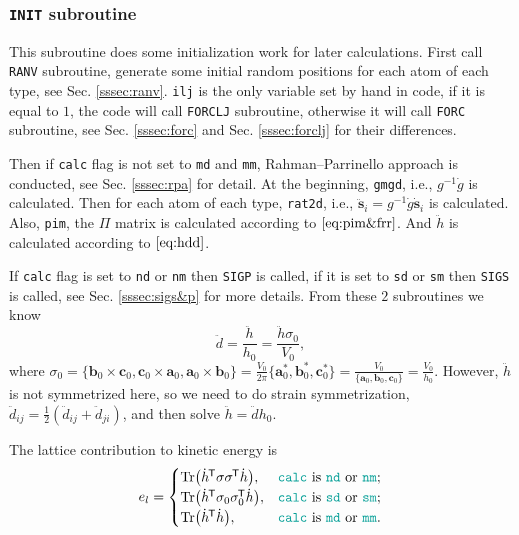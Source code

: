 
\subsubsection{\texttt{INIT} subroutine}
\label{sssec:init}

This subroutine does some initialization work for later calculations.
First call \texttt{RANV} subroutine,
generate some initial random positions for each atom of each type,
see Sec. \ref{sssec:ranv}.
\texttt{ilj} is the only variable set by hand in code, if it is equal to $1$,
the code will call \texttt{FORCLJ} subroutine, otherwise it will call \texttt{FORC}
subroutine, see Sec. \ref{sssec:forc} and Sec. \ref{sssec:forclj} for their differences.

Then if \texttt{calc} flag is not set to \texttt{md} and \texttt{mm},
Rahman--Parrinello approach is conducted, see Sec. \ref{sssec:rpa} for detail.
At the beginning, \texttt{gmgd}, i.e., $g^{-1} \dot{g}$ is calculated.
Then for each atom of each type,
\texttt{rat2d}, i.e., $\ddot{\bm{s}}_i = g^{-1} \dot{g} \dot{ \bm{s} }_i$ is calculated.
Also, \texttt{pim}, the $\Pi$ matrix is calculated according to $\eqref{eq:pim&frr}$.
And $\ddot{h}$ is calculated according to $\eqref{eq:hdd}$.

If \texttt{calc} flag is set to \texttt{nd} or \texttt{nm}
then \texttt{SIGP} is called, if it is set to \texttt{sd} or
\texttt{sm} then \texttt{SIGS} is called, see Sec. \ref{sssec:sigs&p}
for more details.
From these $2$ subroutines we know
\begin{equation}
	\ddot{d} = \frac{ \ddot{h} }{ h_0 } = \frac{ \ddot{h} \sigma_0}{V_0},
\end{equation}
where
$\sigma_0 =
\{
\bm{b}_0 \times \bm{c}_0, \bm{c}_0 \times \bm{a}_0,
\bm{a}_0 \times \bm{b}_0
\}
= \frac{ V_0 }{ 2\pi } \{
\bm{a}^\ast_0, \bm{b}^\ast_0, \bm{c}^\ast_0
\} = \frac{ V_0 }{ \{\bm{a}_0, \bm{b}_0, \bm{c}_0 \} } = \frac{ V_0 }{ h_0 }$.
However, $\ddot{h}$ is not symmetrized here, so we need to do
strain symmetrization, $\ddot{d}_{ij} = \frac{ 1 }{ 2 }
(\ddot{d}_{ij} + \ddot{d}_{ji})$, and then solve
$\ddot{h} = \ddot{d} h_0$.

The lattice contribution to kinetic energy is
\begin{equation}\label{eq:calc}
	e_l =
	\begin{cases}
		\Tr (\dot{h}\tran \sigma \sigma\tran \dot{h}),      & \text{\texttt{calc} is \texttt{nd} or \texttt{nm};} \\
		\Tr(\dot{h}\tran \sigma_0 \sigma_0\tran \dot{ h }), & \text{\texttt{calc} is \texttt{sd} or \texttt{sm};} \\
		\Tr(\dot{h}\tran \dot{ h }),                        & \text{\texttt{calc} is \texttt{md} or \texttt{mm}.}
	\end{cases}
\end{equation}

